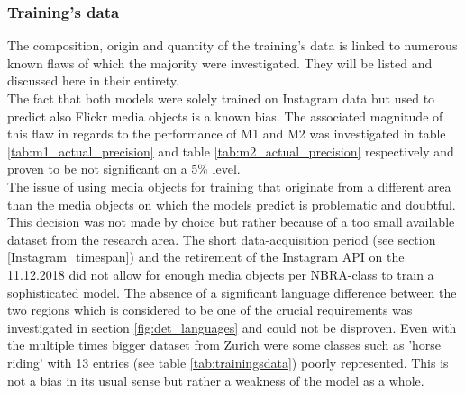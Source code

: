 \subsubsection*{Training's data} The composition, origin and quantity of the training's data is linked to numerous known flaws of which the majority were investigated. They will be listed and discussed here in their entirety. \\
The fact that both models were solely trained on Instagram data but used to predict also Flickr media objects is a known bias. The associated magnitude of this flaw in regards to the performance of M1 and M2 was investigated in table \ref{tab:m1_actual_precision} and table \ref{tab:m2_actual_precision} respectively and proven to be not significant on a 5\% level. \\
The issue of using media objects for training that originate from a different area than the media objects on which the models predict is problematic and doubtful. This decision was not made by choice but rather because of a too small available dataset from the research area. The short data-acquisition period (see section \ref{Instagram_timespan}) and the retirement of the Instagram API on the 11.12.2018 did not allow for enough media objects per NBRA-class to train a sophisticated model. The absence of a significant language difference between the two regions which is considered to be one of the crucial requirements was investigated in section \ref{fig:det_languages} and could not be disproven.
Even with the multiple times bigger dataset from Zurich were some classes such as 'horse riding' with 13 entries (see table \ref{tab:trainingsdata}) poorly represented. This is not a bias in its usual sense but rather a weakness of the model as a whole.

